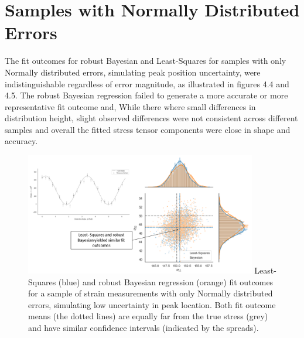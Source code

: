 \section{Samples with Normally Distributed Errors}
\label{sec:sec01}

The fit outcomes for robust Bayesian and Least-Squares for samples with only Normally distributed errors, simulating peak position uncertainty, were indistinguishable regardless of  error magnitude, as illustrated in figures 4.4 and 4.5. The robust Bayesian regression failed to generate a more accurate or more representative fit outcome and, While there where small differences in distribution height, slight observed differences were not consistent across different samples and overall the fitted stress tensor components were close in shape and accuracy.

\begin{figure}[H]
 	\centering
 	\includegraphics[width=0.9\textwidth]{chapters/chapter03/fig03/s13D.png}
 	\mycaption
 	{Least-Squares (blue) and robust Bayesian regression (orange) fit outcomes for a sample of strain measurements with only Normally distributed errors, simulating low uncertainty in peak location. Both fit outcome means (the dotted lines) are equally far from the true stress (grey) and have similar confidence intervals (indicated by the spreads).}
    \label{fig:RHP02}
 \end{figure}

